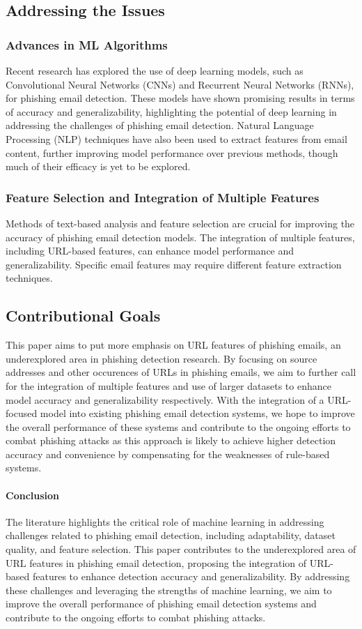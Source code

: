 \subsection{Addressing the Issues}
\subsubsection{Advances in ML Algorithms}
Recent research has explored the use of deep learning models, such as Convolutional Neural Networks (CNNs) and Recurrent Neural Networks (RNNs), for phishing email detection. These models have shown promising results in terms of accuracy and generalizability, highlighting the potential of deep learning in addressing the challenges of phishing email detection. Natural Language Processing (NLP) techniques have also been used to extract features from email content, further improving model performance over previous methods, though much of their efficacy is yet to be explored.
\subsubsection{Feature Selection and Integration of Multiple Features}
Methods of text-based analysis and feature selection are crucial for improving the accuracy of phishing email detection models. The integration of multiple features, including URL-based features, can enhance model performance and generalizability. Specific email features may require different feature extraction techniques.

\subsection{Contributional Goals}
This paper aims to put more emphasis on URL features of phishing emails, an underexplored area in phishing detection research. By focusing on source addresses and other occurences of URLs in phishing emails, we aim to further call for the integration of multiple features and use of larger datasets to enhance model accuracy and generalizability respectively. With the integration of a URL-focused model into existing phishing email detection systems, we hope to improve the overall performance of these systems and contribute to the ongoing efforts to combat phishing attacks as this approach is likely to achieve higher detection accuracy and convenience by compensating for the weaknesses of rule-based systems.

\paragraph{Conclusion}
The literature highlights the critical role of machine learning in addressing challenges related to phishing email detection, including adaptability, dataset quality, and feature selection. This paper contributes to the underexplored area of URL features in phishing email detection, proposing the integration of URL-based features to enhance detection accuracy and generalizability. By addressing these challenges and leveraging the strengths of machine learning, we aim to improve the overall performance of phishing email detection systems and contribute to the ongoing efforts to combat phishing attacks.

